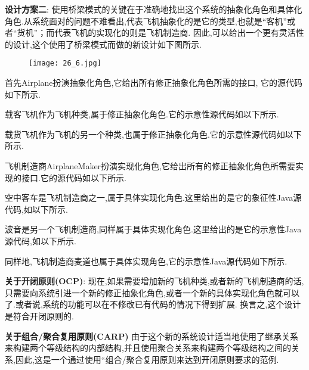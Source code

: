 \documentclass[../main.tex]{subfiles}
\begin{document}
\textbf{设计方案二}:
使用桥梁模式的关键在于准确地找出这个系统的抽象化角色和具体化角色.从系统面对的问题不难看出,代表飞机抽象化的是它的类型,也就是``客机''或者``货机''；而代表飞机的实现化的则是飞机制造商.
因此,可以给出一个更有灵活性的设计,这个使用了桥梁模式而做的新设计如下图所示.
%
\begin{figure}[H]
  \texttt{[image: 26\_6.jpg]}
\end{figure}
%
首先Airplane扮演抽象化角色,它给出所有修正抽象化角色所需的接口, 它的源代码如下所示.
%

%
载客飞机作为飞机种类,属于修正抽象化角色.它的示意性源代码如以下所示.
%

%
载货飞机作为飞机的另一个种类,也属于修正抽象化角色.它的示意性源代码如以下所示.
%

%
飞机制造商AirplaneMaker扮演实现化角色,它给出所有的修正抽象化角色所需要实现的接口.它的源代码如以下所示.
%

%
空中客车是飞机制造商之一,属于具体实现化角色.这里给出的是它的象征性Java源代码,如以下所示.
%

%
波音是另一个飞机制造商,同样属于具体实现化角色.这里给出的是它的示意性Java源代码,如以下所示.
%

%
同样地,飞机制造商麦道也属于具体实现角色,它的示意性Java源代码如下所示.
%

%
\textbf{关于开闭原则(OCP)}:
现在,如果需要增加新的飞机种类,或者新的飞机制造商的话,只需要向系统引进一个新的修正抽象化角色,或者一个新的具体实现化角色就可以了.或者说,系统的功能可以在不修改已有代码的情况下得到扩展.
换言之,这个设计是符合开闭原则的.

\textbf{关于组合/聚合复用原则(CARP)}
由于这个新的系统设计适当地使用了继承关系来构建两个等级结构的内部结构,并且使用聚合关系来构建两个等级结构之间的关系,因此,这是一个通过使用``组合/聚合复用原则来达到开闭原则要求的范例.
%
\end{document}

